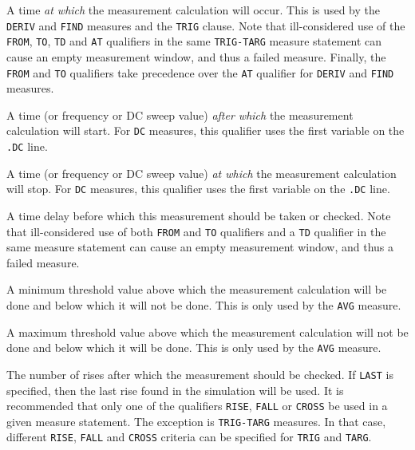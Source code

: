 \begin{Command}
\begin{Arguments}
A time {\em at which} the measurement calculation will occur.  This is
used by the {\tt DERIV} and {\tt FIND} measures and the {\tt TRIG} clause.  Note that
ill-considered use of the {\tt FROM}, {\tt TO}, {\tt TD} and {\tt AT}
qualifiers in the same {\tt TRIG-TARG} measure statement can cause an
empty measurement window, and thus a failed measure.  Finally, the {\tt FROM}
and {\tt TO} qualifiers take precedence over the {\tt AT} qualifier for
{\tt DERIV} and {\tt FIND} measures.


A time (or frequency or DC sweep value) {\em after which} the
measurement calculation will start.  For {\tt DC} measures, this
qualifier uses the first variable on the {\tt .DC} line.


A time (or frequency or DC sweep value) {\em at which} the measurement
calculation will stop.  For {\tt DC} measures, this qualifier uses the
first variable on the {\tt .DC} line.


A time delay before which this measurement should be taken or checked.
Note that ill-considered use of both {\tt FROM} and {\tt TO}
qualifiers and a {\tt TD} qualifier in the same measure statement can
cause an empty measurement window, and thus a failed measure.


A minimum threshold value above which the measurement calculation will
be done and below which it will not be done.  This is only used by the
{\tt AVG} measure.


A maximum threshold value above which the measurement calculation will
not be done and below which it will be done.  This is only used by the
{\tt AVG} measure.


The number of rises after which the measurement should be checked.  If
\texttt{LAST} is specified, then the last rise found in the simulation
will be used.  It is recommended that only one of the qualifiers {\tt RISE}, 
{\tt FALL} or {\tt CROSS} be used in a given measure statement.  The exception 
is {\tt TRIG-TARG} measures.  In that case, different {\tt RISE}, {\tt FALL}
and {\tt CROSS} criteria can be specified for {\tt TRIG} and {\tt TARG}.



\end{Arguments}
\end{Command}
